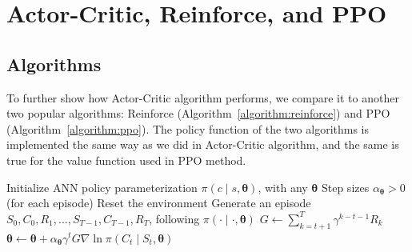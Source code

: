 \documentclass[balance,upint,subscriptcorrection,varvw,mathalfa=cal=boondoxo,pdf-a,colorlinks,nofoot]{asmeconf}
\begin{document}
\section{Actor-Critic, Reinforce, and PPO}
\subsection{Algorithms}
\noindent To further show how Actor-Critic algorithm performs, we compare it 
to another two popular algorithms: Reinforce 
(Algorithm~\ref{algorithm:reinforce}) and PPO (Algorithm~\ref{algorithm:ppo}).
The policy function of the two algorithms is implemented the same way as we 
did in Actor-Critic algorithm, and the same is true for the value function 
used in PPO method.
\begin{algorithm}
    \caption{Reinforce for financial problem}\label{algorithm:reinforce}
    \begin{algorithmic}[1]
        \State Initialize ANN policy parameterization
        \(\pi\left(c\middle|s, \bm{\theta}\right)\), with any \(\bm{\theta}\)
        \State Step sizes \(\alpha_{\bm{\theta}}>0\)
        \Loop \hspace{0.3mm} (for each episode)
        \State Reset the environment
        \State Generate an episode 
        \(S_0, C_0, R_1, ..., S_{T-1}, C_{T-1}, R_T\),
        following \(\pi\left(\cdot\middle|\cdot, \bm{\theta}\right)\)
        \State \(G \gets \sum_{k=t+1}^{T} \gamma^{k-t-1}R_k\)
        \State \(\bm{\theta} \gets \bm{\theta} + \alpha_{\bm{\theta}}\gamma^t
        G\nabla{\ln{\pi\left(C_t\middle|S_t, \bm{\theta}\right)}}\)
        \EndFor
        \EndLoop
    \end{algorithmic}
\end{algorithm}
\end{document}
